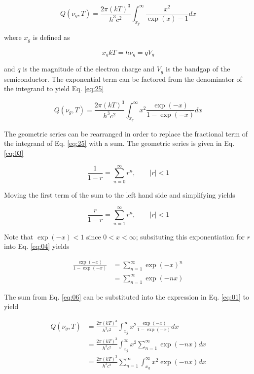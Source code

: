 \documentclass[letterpaper,12pt]{article}
\begin{document}
{\begin{equation} \label{eq:01}
Q(\nu_{g}, T) = \frac{2\pi (kT)^{3}}{h^{3} c^{2}} \int_{x_{g}}^{\infty} \frac{x^{2}}{\exp(x) - 1} dx
\end{equation}

\noindent where $x_{g}$ is defined as

\begin{equation} \label{eq:02}
x_{g}kT = h \nu_{g} = q V_{g}
\end{equation}

\noindent and $q$ is the magnitude of the electron charge and $V_{g}$ is the bandgap of the semiconductor. The exponential term can be factored from the denominator of the integrand to yield Eq. \ref{eq:25}

\begin{equation} \label{eq:25}
Q(\nu_{g}, T) = \frac{2\pi (kT)^{3}}{h^{3} c^{2}} \int_{x_{g}}^{\infty} x^{2} \frac{\exp(-x)}{1 - \exp(-x)} dx
\end{equation}

The geometric series can be rearranged in order to replace the fractional term of the integrand of Eq. \ref{eq:25} with a sum. The geometric series is given in Eq. \ref{eq:03}

\begin{equation} \label{eq:03}
\frac{1}{1-r} = \sum_{n = 0}^{\infty} r^{n}, \qquad |r| < 1
\end{equation}

\noindent Moving the first term of the sum to the left hand side and simplifying yields

\begin{equation} \label{eq:04}
\frac{r}{1-r} = \sum_{n = 1}^{\infty} r^{n}, \qquad |r| < 1
\end{equation}

\noindent Note that $\exp(-x) < 1$ since $0 < x < \infty$; subsituting this exponentiation for $r$ into Eq. \ref{eq:04} yields

\begin{align} \label{eq:06}
\frac{\exp(-x)}{1 - \exp(-x)} &= \sum_{n = 1}^{\infty} \exp(-x)^{n} \nonumber \\
 &= \sum_{n = 1}^{\infty} \exp(-nx)
\end{align}

The sum from Eq. \ref{eq:06} can be substituted into the expression in Eq. \ref{eq:01} to yield

\begin{align} \label{eq:07}
Q(\nu_{g}, T) &= \frac{2\pi (kT)^{3}}{h^{3} c^{2}} \int_{x_{g}}^{\infty} x^{2} \frac{\exp(-x)}{1 - \exp(-x)} dx \nonumber \\
 &= \frac{2\pi (kT)^{3}}{h^{3} c^{2}} \int_{x_{g}}^{\infty} x^{2} \sum_{n = 1}^{\infty} \exp(-nx) dx \nonumber \\
 &= \frac{2\pi (kT)^{3}}{h^{3} c^{2}} \sum_{n = 1}^{\infty} \int_{x_{g}}^{\infty} x^{2} \exp(-nx) dx
\end{align}

}
\end{document}
